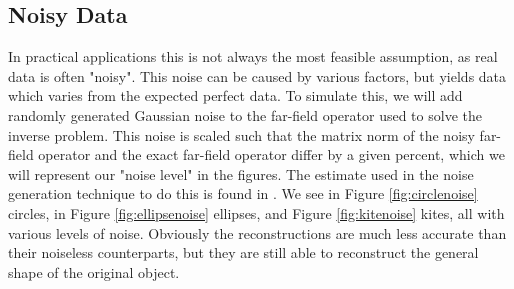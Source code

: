 \documentclass[]{article}
\begin{document}
			\subsection{Noisy Data}
				In practical applications this is not always the most feasible assumption, as real data is often "noisy". This noise can be caused by various factors, but yields data which varies from the expected perfect data. To simulate this, we will add randomly generated Gaussian noise to the far-field operator used to solve the inverse problem. This noise is scaled such that the matrix norm of the noisy far-field operator and the exact far-field operator differ by a given percent, which we will represent our "noise level" in the figures. The estimate used in the noise generation technique to do this is found in \cite{hansen1988}. We see in Figure \ref{fig:circlenoise} circles, in Figure \ref{fig:ellipsenoise} ellipses, and Figure \ref{fig:kitenoise} kites, all with various levels of noise. Obviously the reconstructions are much less accurate than their noiseless counterparts, but they are still able to reconstruct the general shape of the original object.
\end{document}
